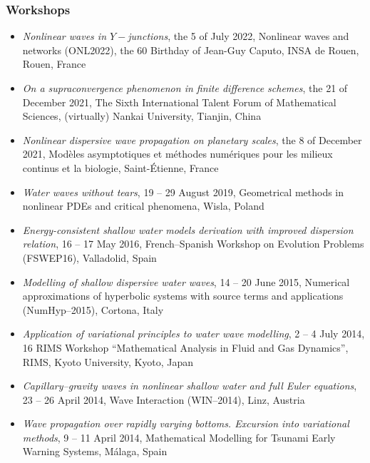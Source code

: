 \documentclass[final, a4paper, oneside, 12pt]{article}
\numberwithin{equation}{section}
\begin{document}
\subsubsection{Workshops}

\begin{itemize}

  \item \textit{Nonlinear waves in $Y-$junctions}, the 5 of July 2022, Nonlinear waves and networks (ONL2022), the $60$ Birthday of Jean-Guy Caputo, INSA de Rouen, Rouen, France

  \item \textit{On a supraconvergence phenomenon in finite difference schemes}, the 21 of December 2021, The Sixth International Talent Forum of Mathematical Sciences, (virtually) Nankai University, Tianjin, China

  \item \textit{Nonlinear dispersive wave propagation on planetary scales}, the 8 of December 2021, Mod\`eles asymptotiques et m\'ethodes num\'eriques pour les milieux continus et la biologie, Saint-\'Etienne, France

  \item \textit{Water waves without tears}, 19 -- 29 August 2019, Geometrical methods in nonlinear PDEs and critical phenomena, Wisla, Poland

  \item \textit{Energy-consistent shallow water models derivation with improved dispersion relation}, 16 -- 17 May 2016, French--Spanish Workshop on Evolution Problems (FSWEP16), Valladolid, Spain

  \item \textit{Modelling of shallow dispersive water waves}, 14 -- 20 June 2015, Numerical approximations of hyperbolic systems with source terms and applications (NumHyp--2015), Cortona, Italy

  \item \textit{Application of variational principles to water wave modelling}, 2 -- 4 July 2014, 16 RIMS Workshop ``Mathematical Analysis in Fluid and Gas Dynamics'', RIMS, Kyoto University, Kyoto, Japan

  \item \textit{Capillary--gravity waves in nonlinear shallow water and full Euler equations}, 23 -- 26 April 2014, Wave Interaction (WIN--2014), Linz, Austria

  \item \textit{Wave propagation over rapidly varying bottoms. Excursion into variational methods}, 9 -- 11 April 2014, Mathematical Modelling for Tsunami Early Warning Systems, M\'alaga, Spain


\end{itemize}
\end{document}
